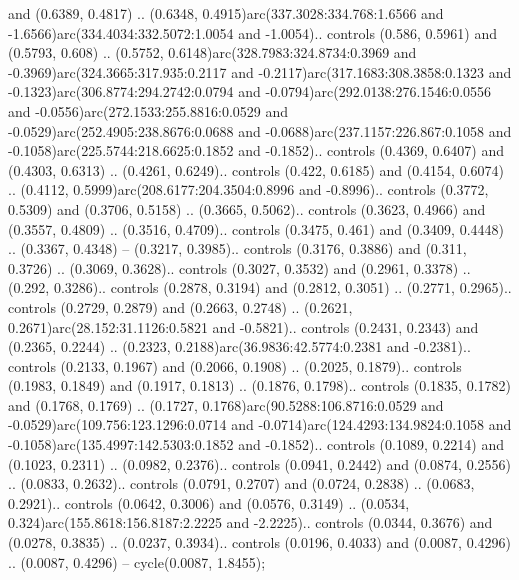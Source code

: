 and (0.6389, 0.4817) .. (0.6348, 0.4915)arc(337.3028:334.768:1.6566 and -1.6566)arc(334.4034:332.5072:1.0054 and -1.0054).. controls (0.586, 0.5961) and (0.5793, 0.608) .. (0.5752, 0.6148)arc(328.7983:324.8734:0.3969 and -0.3969)arc(324.3665:317.935:0.2117 and -0.2117)arc(317.1683:308.3858:0.1323 and -0.1323)arc(306.8774:294.2742:0.0794 and -0.0794)arc(292.0138:276.1546:0.0556 and -0.0556)arc(272.1533:255.8816:0.0529 and -0.0529)arc(252.4905:238.8676:0.0688 and -0.0688)arc(237.1157:226.867:0.1058 and -0.1058)arc(225.5744:218.6625:0.1852 and -0.1852).. controls (0.4369, 0.6407) and (0.4303, 0.6313) .. (0.4261, 0.6249).. controls (0.422, 0.6185) and (0.4154, 0.6074) .. (0.4112, 0.5999)arc(208.6177:204.3504:0.8996 and -0.8996).. controls (0.3772, 0.5309) and (0.3706, 0.5158) .. (0.3665, 0.5062).. controls (0.3623, 0.4966) and (0.3557, 0.4809) .. (0.3516, 0.4709).. controls (0.3475, 0.461) and (0.3409, 0.4448) .. (0.3367, 0.4348) -- (0.3217, 0.3985).. controls (0.3176, 0.3886) and (0.311, 0.3726) .. (0.3069, 0.3628).. controls (0.3027, 0.3532) and (0.2961, 0.3378) .. (0.292, 0.3286).. controls (0.2878, 0.3194) and (0.2812, 0.3051) .. (0.2771, 0.2965).. controls (0.2729, 0.2879) and (0.2663, 0.2748) .. (0.2621, 0.2671)arc(28.152:31.1126:0.5821 and -0.5821).. controls (0.2431, 0.2343) and (0.2365, 0.2244) .. (0.2323, 0.2188)arc(36.9836:42.5774:0.2381 and -0.2381).. controls (0.2133, 0.1967) and (0.2066, 0.1908) .. (0.2025, 0.1879).. controls (0.1983, 0.1849) and (0.1917, 0.1813) .. (0.1876, 0.1798).. controls (0.1835, 0.1782) and (0.1768, 0.1769) .. (0.1727, 0.1768)arc(90.5288:106.8716:0.0529 and -0.0529)arc(109.756:123.1296:0.0714 and -0.0714)arc(124.4293:134.9824:0.1058 and -0.1058)arc(135.4997:142.5303:0.1852 and -0.1852).. controls (0.1089, 0.2214) and (0.1023, 0.2311) .. (0.0982, 0.2376).. controls (0.0941, 0.2442) and (0.0874, 0.2556) .. (0.0833, 0.2632).. controls (0.0791, 0.2707) and (0.0724, 0.2838) .. (0.0683, 0.2921).. controls (0.0642, 0.3006) and (0.0576, 0.3149) .. (0.0534, 0.324)arc(155.8618:156.8187:2.2225 and -2.2225).. controls (0.0344, 0.3676) and (0.0278, 0.3835) .. (0.0237, 0.3934).. controls (0.0196, 0.4033) and (0.0087, 0.4296) .. (0.0087, 0.4296) -- cycle(0.0087, 1.8455);



